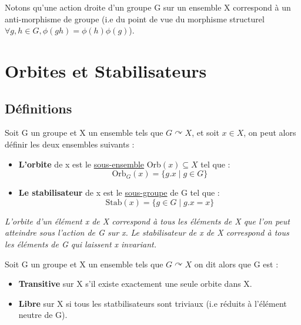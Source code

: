 \begin{remark}
	Notons qu'une action droite d'un groupe G sur un ensemble X correspond à un anti-morphisme de groupe 
	(i.e du point de vue du morphisme structurel $ \forall g,h \in G, \phi(gh) = \phi(h)\phi(g)$).
\end{remark}


\section{Orbites et Stabilisateurs}
\subsection{Définitions}

\begin{definition}
	Soit G un groupe et X un ensemble tels que $G \curvearrowright X$, et soit $x \in X$, on peut alors définir les deux ensembles suivants :
	\begin{itemize}
		\item \textbf{L'orbite} de x est le \underline{sous-ensemble} Orb$(x) \subseteq X$ tel que :
			\[ \boxed{ \text{Orb}_G(x) = \{g.x \; | \; g \in G\} } \] 
		\item \textbf{Le stabilisateur} de x est le \underline{sous-groupe} de G tel que :
			\[ \boxed{ \text{Stab}(x) = \{ g \in G \; | \; g.x = x \} }\] 
	\end{itemize}
	\emph{L'orbite d'un élément x de X correspond à tous les éléments de X que l'on peut atteindre sous l'action de G sur x.}
	\emph{Le stabilisateur de x de X correspond à tous les éléments de G qui laissent x invariant.}
\end{definition}


\newpage 

\begin{definition}
	Soit G un groupe et X un ensemble tels que $G \curvearrowright X$ on dit alors que G est :
	\begin{itemize}
		\item \textbf{Transitive} sur X s'il existe exactement une seule orbite dans X. 
		\item \textbf{Libre} sur X si tous les statbilisateurs sont triviaux (i.e réduits à l'élément neutre de G). 
	\end{itemize}
\end{definition}

